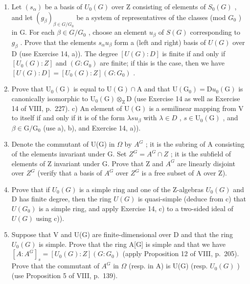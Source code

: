 \begin{enumerate}
\def\labelenumi{\alph{enumi})}
\item
  Let \((s_{\alpha})\) be a basis of \(U_{0}(G)\) over Z consisting of elements of \(S_{0}(G)\) , and let \((g_{\beta})_{\beta\in G/G_{0}}\) be a system of representatives of the classes (mod \(G_{0}\) ) in G. For each \(\beta\in G/G_{0}\) , choose an element \(u_{\beta}\) of \(S(G)\) corresponding to \(g_{\beta}\) . Prove that the elements \(s_{\alpha}u_{\beta}\) form a (left and right) basis of \(U(G)\) over D (use Exercise 14, a)). The degree \([U(G):D]\) is finite if and only if \([U_{0}(G):Z]\) and \((G:G_{0})\) are finite; if this is the case, then we have \([U(G):D]=[U_{0}(G):Z](G:G_{0})\) .
\item
  Prove that \(\mathrm{U}_{0}(\mathrm{G})\) is equal to \(\mathrm{U}(\mathrm{G})\cap\mathrm{A}\) and that \(\mathrm{U}(\mathrm{G}_{0})=\mathrm{D}u_{0}(\mathrm{G})\) is canonically isomorphic to \(\mathrm{U}_{0}(\mathrm{G})\otimes_{\mathrm{Z}}\mathrm{D}\) (use Exercise 14 as well as Exercise 14 of VIII, p.~227). c) An element of \(\mathrm{U}(\mathrm{G})\) is a semilinear mapping from V to itself if and only if it is of the form \(\lambda su_{\beta}\) with \(\lambda\in D\) , \(s\in\mathrm{U}_{0}(\mathrm{G})\) , and \(\beta\in\mathrm{G}/\mathrm{G}_{0}\) (use a), b), and Exercise 14, a)).
\item
  Denote the commutant of U(G) in \(\Omega\) by \(A^{G}\) ; it is the subring of A consisting of the elements invariant under G. Set \(Z^{G} = A^{G} \cap Z\) ; it is the subfield of elements of Z invariant under G. Prove that Z and \(A^{G}\) are linearly disjoint over \(Z^{G}\) (verify that a basis of \(A^{G}\) over \(Z^{G}\) is a free subset of A over Z).
\item
  Prove that if \(U_{0}(G)\) is a simple ring and one of the Z-algebras \(U_{0}(G)\) and D has finite degree, then the ring \(U(G)\) is quasi-simple (deduce from c) that \(U(G_{0})\) is a simple ring, and apply Exercise 14, c) to a two-sided ideal of \(U(G)\) using c)).
\item
  Suppose that V and U(G) are finite-dimensional over D and that the ring \(U_{0}(G)\) is simple. Prove that the ring A{[}G{]} is simple and that we have \([A : A^{G}]_{s} = [U_{0}(G) : Z](G : G_{0})\) (apply Proposition 12 of VIII, p.~205). Prove that the commutant of \(A^{G}\) in \(\Omega\) (resp. in A) is U(G) (resp. \(U_{0}(G)\) ) (use Proposition 5 of VIII, p.~139).
\end{enumerate}

